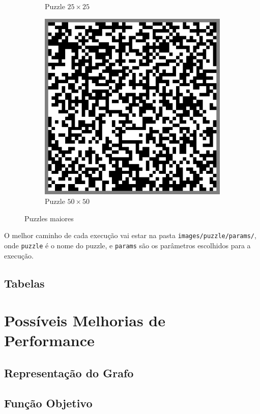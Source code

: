 \documentclass{article}
\newcommand{\file}{\texttt}
\begin{document}
\begin{figure}[h]
\begin{subfigure}{0.3\textwidth}
        \caption{Puzzle \(25 \times 25\)}
        \label{p:random25}
    \end{subfigure}
    \begin{subfigure}{0.3\textwidth}
        \centering
        \includegraphics[width=0.9\linewidth]{random50-border}
        \caption{Puzzle \(50 \times 50\)}
        \label{p:random50}
    \end{subfigure}
    \caption{Puzzles maiores}
    \label{pg:others}
\end{figure}

O melhor caminho de cada execução vai estar
na pasta \file{images/puzzle/params/},
onde \file{puzzle} é o nome do puzzle,
e \file{params} são os parâmetros escolhidos
para a execução.

\subsection{Tabelas}

\section{Possíveis Melhorias de Performance}
\subsection{Representação do Grafo}

\subsection{Função Objetivo}
\end{document}
